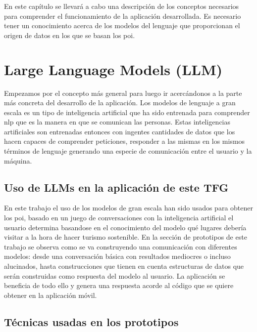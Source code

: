 
En este capítulo se llevará a cabo una descripción de los conceptos necesarios para comprender el funcionamiento de la aplicación desarrollada. Es necesario tener un conocimiento acerca de los modelos del lenguaje que proporcionan el origen de datos en los que se basan los \acrfull{poi}.



\section{Large Language Models (LLM)}

Empezamos por el concepto más general para luego ir acercándonos a la parte más concreta del desarrollo de la aplicación. Los modelos de lenguaje a gran escala es un tipo de inteligencia artificial que ha sido entrenada para comprender \acrfull{nlp} que es la manera en que se comunican las personas. Estas inteligencias artificiales son entrenadas entonces con ingentes cantidades de datos que los hacen capaces de comprender peticiones, responder a las mismas en los mismos términos de lenguaje generando una especie de comunicación entre el usuario y la máquina.



\subsection{Uso de LLMs en la aplicación de este TFG}

En este trabajo el uso de los modelos de gran escala han sido usados para obtener los \acrfull{poi}, basado en un juego de conversaciones con la inteligencia artificial el usuario determina basandose en el conocimiento del modelo qué lugares debería visitar a la hora de hacer turismo sostenible.
En la sección de prototipos de este trabajo se observa como se va construyendo una comunicación con diferentes modelos: desde una conversación básica con resultados mediocres o incluso alucinados, hasta construcciones que tienen en cuenta estructuras de datos que serán construidas como respuesta del modelo al usuario. La aplicación se beneficia de todo ello y genera una respuesta acorde al código que se quiere obtener en la aplicación móvil.
\subsection{Técnicas usadas en los prototipos}
